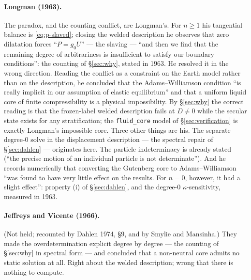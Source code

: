 \documentclass[11pt]{article}
\theoremstyle{definition}
\theoremstyle{remark}
\newcommand{\code}[1]{\texttt{#1}}
\begin{document}
\paragraph{Longman (1963).} The paradox, and the counting conflict,
are Longman's. For $n \ge 1$ his tangential balance is
\eqref{eq:p-slaved}; closing the welded description he observes that
zero dilatation forces ``$P = g_0U$'' --- the slaving --- ``and then
we find that the remaining degree of arbitrariness is insufficient to
satisfy our boundary conditions'': the counting of \S\ref{sec:why},
stated in 1963. He resolved it in the wrong direction. Reading the
conflict as a constraint on the Earth model rather than on the
description, he concluded that the Adams--Williamson condition ``is
really implicit in our assumption of elastic equilibrium'' and that a
uniform liquid core of finite compressibility is a physical
impossibility. By \S\ref{sec:why} the correct reading is that the
frozen-label welded description fails at $D \ne 0$ while the secular
state exists for any stratification; the \code{fluid\_core} model of
\S\ref{sec:verification} is exactly Longman's impossible core. Three
other things are his. The separate degree-0 solve in the displacement
description --- the spectral repair of \S\ref{sec:dahlen} ---
originates here. The particle indeterminacy is already stated (``the
precise motion of an individual particle is not determinate''). And he
records numerically that converting the Gutenberg core to
Adams--Williamson ``was found to have very little effect on the
results. For $n = 0$, however, it had a slight effect'': property (i)
of \S\ref{sec:dahlen}, and the degree-0 $\kappa$-sensitivity, measured
in 1963.

\paragraph{Jeffreys and Vicente (1966).} (Not held; recounted by
Dahlen 1974, \S9, and by Smylie and Mansinha.) They made the
overdetermination explicit degree by degree --- the counting of
\S\ref{sec:why} in spectral form --- and concluded that a non-neutral
core admits no static solution at all. Right about the welded
description; wrong that there is nothing to compute.
\end{document}
